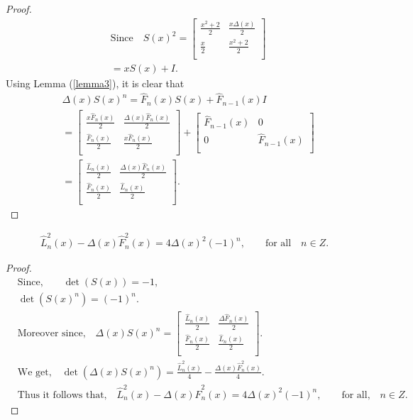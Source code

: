 \begin{proof}
\begin{align*}
&\text{Since}\quad S(x)^2={\left[
 \begin{array}{cc}
    \frac{x^2+2}{2} & \frac{x\Delta(x)}{2} \\
    \frac{x}{2}& \frac{x^2+2}{2} \\
	\end{array}
	\right]}\\&=x S(x)+I.
	\end{align*}
	Using Lemma (\ref{lemma3}), it is clear that
	\begin{align*}
	&\Delta(x) S(x)^n=\widehat{F}_{n}(x)S(x)+\widehat{F}_{n-1}(x)I\\
	&= {\left[
 \begin{array}{cc}
    \frac{x\widehat{F}_{n}(x)}{2} & \frac{\Delta(x)\widehat{F}_{n}(x)}{2} \\
    \frac{\widehat{F}_{n}(x)}{2}& \frac{x\widehat{F}_{n}(x)}{2} \\
	\end{array}
	\right]}+{\left[
 \begin{array}{cc}
    \widehat{F}_{n-1}(x) & 0 \\
    0& \widehat{F}_{n-1}(x) \\
	\end{array}
	\right]}\\
	&={\left[
 \begin{array}{cc}
    \frac{\widehat{L}_{n}(x)}{2} & \frac{\Delta(x)\widehat{F}_{n}(x)}{2} \\
    \frac{\widehat{F}_{n}(x)}{2} & \frac{\widehat{L}_{n}(x)}{2} \\
	\end{array}
	\right]}.
\end{align*}
\end{proof}
\begin{lemma}\label{25}
\begin{align*} \widehat{L}^2_{n}(x)-\Delta(x) \widehat{F}^2_{n}(x)=4\Delta(x)^2(-1)^n,\qquad \text{for all} \quad n\in Z.
\end{align*}
\end{lemma}
\begin{proof}
\begin{align*}
&\text{Since,} \qquad \det(S(x))= -1,\\
&\det(S(x)^n)=(-1)^n.\\
&\text{Moreover since,} \quad\Delta(x) S(x)^n={\left[
 \begin{array}{cc}
    \frac{\widehat{L}_{n}(x)}{2} & \frac{\Delta\widehat{F}_{n}(x)}{2} \\
    \frac{\widehat{F}_{n}(x)}{2} & \frac{\widehat{L}_{n}(x)}{2} \\
	\end{array}
	\right]}.\\
&\text{We get,}\quad	\det(\Delta(x) S(x)^n)=\frac{\widehat{L}^2_{n}(x)}{4}-\frac{\Delta(x) \widehat{F}^2_{n}(x)}{4}.\\
&\text{Thus it follows that,}\quad
 \widehat{L}^2_{n}(x)-\Delta(x) \widehat{F}^2_{n}(x)=4\Delta(x)^2(-1)^n,\qquad \text{for all,} \quad n\in Z.
\end{align*}
\end{proof}
